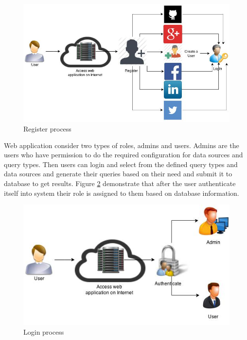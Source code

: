 \documentclass[a4paper,11pt]{report}
\begin{document}
\begin{figure}[!ht]
\begin{center}
\includegraphics[scale=0.5]{users_register.jpg}
\end{center}
\caption{Register process}
\label{fig:usersregister}
\end{figure}


Web application consider two types of roles, admins and users. Admins are the users who have permission to do the required configuration for data sources and query types. Then users can login and select from the defined query types and data sources and generate their queries based on their need and submit it to database to get results. Figure \ref{fig:userslogin} demonstrate that after the user authenticate itself into system their role is assigned to them based on database information.

\begin{figure}[!ht]
\begin{center}
\includegraphics[scale=0.5]{Users_login.jpg}
\end{center}
\caption{Login process}
\label{fig:userslogin}
\end{figure}
\end{document}
